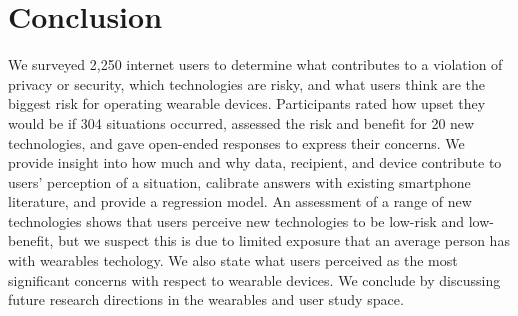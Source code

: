 \documentclass{acm_proc_article-sp}
\begin{document}


\section{Conclusion}

We surveyed 2,250 internet users to determine what contributes to a violation of privacy or security, which technologies are risky, and what users think are the biggest risk for operating wearable devices. Participants rated how upset they would be if 304 situations occurred, assessed the risk and benefit for 20 new technologies, and gave open-ended responses to express their concerns. We provide insight into how much and why data, recipient, and device contribute to users' perception of a situation, calibrate answers with existing smartphone literature, and provide a regression model. An assessment of a range of new technologies shows that users perceive new technologies to be low-risk and low-benefit, but we suspect this is due to limited exposure that an average person has with wearables techology. We also state what users perceived as the most significant concerns with respect to wearable devices. We conclude by discussing future research directions in the wearables and user study space. 


\end{document}
